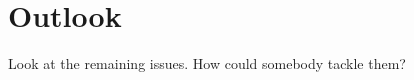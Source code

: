 \chapter{Outlook}\label{cha:outlook}

Look at the remaining issues. How could somebody tackle them?
